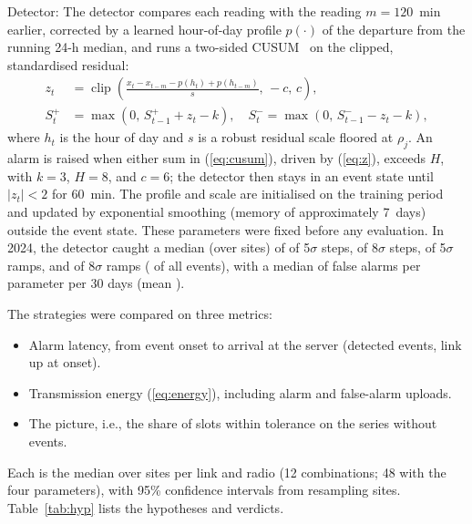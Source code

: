 Detector: The detector compares each reading with the reading $m=120$~min earlier, corrected by a learned hour-of-day profile $p(\cdot)$ of the departure from the running 24-h median, and runs a two-sided CUSUM~\cite{page1954continuous} on the clipped, standardised residual:
\begin{align}
z_t&=\operatorname{clip}\!\left(\frac{x_t-x_{t-m}-p(h_t)+p(h_{t-m})}{s},\,-c,\,c\right),\label{eq:z}\\
S^{+}_t&=\max\left(0,\,S^{+}_{t-1}+z_t-k\right),\quad S^{-}_t=\max\left(0,\,S^{-}_{t-1}-z_t-k\right),\label{eq:cusum}
\end{align}
where $h_t$ is the hour of day and $s$ is a robust residual scale floored at $\rho_j$. An alarm is raised when either sum in (\ref{eq:cusum}), driven by (\ref{eq:z}), exceeds $H$, with $k=3$, $H=8$, and $c=6$; the detector then stays in an event state until $|z_t|<2$ for 60~min. The profile and scale are initialised on the training period and updated by exponential smoothing (memory of approximately 7~days) outside the event state. These parameters were fixed before any evaluation. In 2024, the detector caught a median (over sites) of \detectStepFive{} of 5$\sigma$ steps, \detectStepEight{} of 8$\sigma$ steps, \detectRampFive{} of 5$\sigma$ ramps, and \detectRampEight{} of 8$\sigma$ ramps (\detectAll{} of all events), with a median of \faMedian{} false alarms per parameter per 30 days (mean \faMean).

The strategies were compared on three metrics:
\begin{itemize}
\item Alarm latency, from event onset to arrival at the server (detected events, link up at onset).
\item Transmission energy (\ref{eq:energy}), including alarm and false-alarm uploads.
\item The picture, i.e., the share of slots within tolerance on the series without events.
\end{itemize}
Each is the median over sites per link and radio (12 combinations; 48 with the four parameters), with 95\% confidence intervals from resampling sites. Table~\ref{tab:hyp} lists the hypotheses and verdicts.

